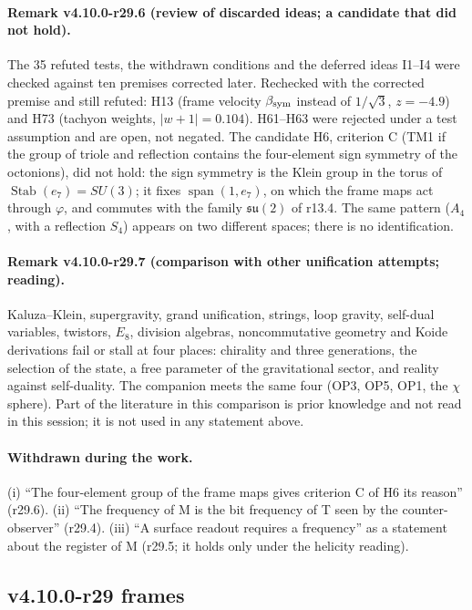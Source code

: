\paragraph{Remark v4.10.0-r29.6 (review of discarded ideas; a candidate that did not hold).}
The 35 refuted tests, the withdrawn conditions and the deferred ideas I1--I4 were checked against ten premises corrected later.  Rechecked with the
corrected premise and still refuted: H13 (frame velocity \(\beta_{\rm sym}\) instead of \(1/\sqrt3\), \(z=-4.9\)) and H73 (tachyon weights,
\(|w+1|=0.104\)).  H61--H63 were rejected under a test assumption and are open, not negated.  The candidate H6, criterion C (TM1 if the group of triole
and reflection contains the four-element sign symmetry of the octonions), did not hold: the sign symmetry is the Klein group in the torus of
\(\operatorname{Stab}(e_7)=SU(3)\); it fixes \(\operatorname{span}(1,e_7)\), on which the frame maps act through \(\varphi\), and commutes with the
family \(\mathfrak{su}(2)\) of r13.4.  The same pattern (\(A_4\), with a reflection \(S_4\)) appears on two different spaces; there is no
identification.

\paragraph{Remark v4.10.0-r29.7 (comparison with other unification attempts; reading).}
Kaluza--Klein, supergravity, grand unification, strings, loop gravity, self-dual variables, twistors, \(E_8\), division algebras, noncommutative
geometry and Koide derivations fail or stall at four places: chirality and three generations, the selection of the state, a free parameter of the
gravitational sector, and reality against self-duality.  The companion meets the same four (OP3, OP5, OP1, the \(\chi\) sphere).  Part of the
literature in this comparison is prior knowledge and not read in this session; it is not used in any statement above.

\paragraph{Withdrawn during the work.}
(i) ``The four-element group of the frame maps gives criterion C of H6 its reason'' (r29.6).  (ii) ``The frequency of M is the bit frequency of T seen
by the counter-observer'' (r29.4).  (iii) ``A surface readout requires a frequency'' as a statement about the register of M (r29.5; it holds only
under the helicity reading).

\subsection*{v4.10.0-r29 frames}
\label{subsec:v4100-r29-frames}


